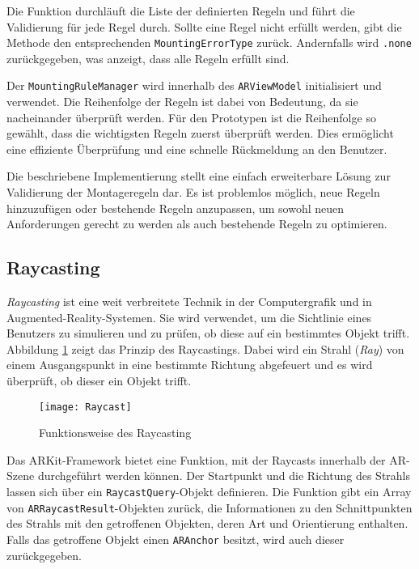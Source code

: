 Die Funktion durchläuft die Liste der definierten Regeln und führt die Validierung für jede Regel durch. Sollte eine Regel nicht erfüllt werden, gibt die Methode den entsprechenden \texttt{MountingErrorType} zurück. Andernfalls wird \texttt{.none} zurückgegeben, was anzeigt, dass alle Regeln erfüllt sind.

Der \texttt{MountingRuleManager} wird innerhalb des \texttt{ARViewModel} initialisiert und verwendet. Die Reihenfolge der Regeln ist dabei von Bedeutung, da sie nacheinander überprüft werden. Für den Prototypen ist die Reihenfolge so gewählt, dass die wichtigsten Regeln zuerst überprüft werden. Dies ermöglicht eine effiziente Überprüfung und eine schnelle Rückmeldung an den Benutzer.

Die beschriebene Implementierung stellt eine einfach erweiterbare Lösung zur Validierung der Montageregeln dar. Es ist problemlos möglich, neue Regeln hinzuzufügen oder bestehende Regeln anzupassen, um sowohl neuen Anforderungen gerecht zu werden als auch bestehende Regeln zu optimieren.

\subsection{Raycasting}\label{Raycasting}

\textit{Raycasting} ist eine weit verbreitete Technik in der Computergrafik und in Augmented-Reality-Systemen. Sie wird verwendet, um die Sichtlinie eines Benutzers zu simulieren und zu prüfen, ob diese auf ein bestimmtes Objekt trifft. Abbildung \ref{fig:Raycasting} zeigt das Prinzip des Raycastings. Dabei wird ein Strahl (\textit{Ray}) von einem Ausgangspunkt in eine bestimmte Richtung abgefeuert und es wird überprüft, ob dieser ein Objekt trifft.

\begin{figure}[ht]
    \centering
    \texttt{[image: Raycast]}
    \caption{Funktionsweise des Raycasting \cite{yuen2024raycasting}}
    \label{fig:Raycasting}
\end{figure}

Das ARKit-Framework bietet eine Funktion, mit der Raycasts innerhalb der AR-Szene durchgeführt werden können. Der Startpunkt und die Richtung des Strahls lassen sich über ein \texttt{RaycastQuery}-Objekt definieren. Die Funktion gibt ein Array von \texttt{ARRaycastResult}-Objekten zurück, die Informationen zu den Schnittpunkten des Strahls mit den getroffenen Objekten, deren Art und Orientierung enthalten. Falls das getroffene Objekt einen \texttt{ARAnchor} besitzt, wird auch dieser zurückgegeben.

